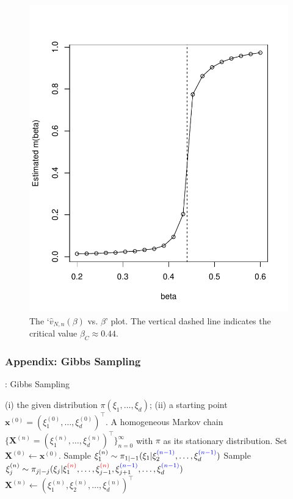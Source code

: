 \documentclass[11pt,letterpaper, leqno]{article}
\numberwithin{equation}{section}
\numberwithin{theorem}{section}
\numberwithin{lemma}{section}
\numberwithin{corollary}{section}
\numberwithin{definition}{section}
\numberwithin{proposition}{section}
\numberwithin{remark}{section}
\numberwithin{example}{section}
\newcommand{\T}{\intercal}
\begin{document}
\begin{figure}
    \centering
    \includegraphics[scale=0.6]{M_beta.pdf}
    \caption{The `$\widehat{v}_{N,n}(\beta)$ vs. $\beta$' plot. The vertical dashed line indicates the critical value $\beta_C\approx 0.44$.}
    \label{fig: M_beta}
\end{figure}

\subsubsection{Appendix: Gibbs Sampling}

\begin{algorithm}[H]
\caption{: Gibbs Sampling}\label{algorithm: Gibbs sampling}
\begin{algorithmic}[1]
    \INPUT (i) the given distribution $\pi(\xi_1,\ldots,\xi_d)$; (ii) a starting point $\boldsymbol{x}^{(0)}=(\xi^{(0)}_1,\ldots, \xi^{(0)}_d)^\T$.
    \OUTPUT A homogeneous Markov chain $\{\boldsymbol{X}^{(n)}=(\xi_1^{(n)}, \ldots, \xi_d^{(n)})^\T\}_{n=0}^\infty$ with $\pi$ as its stationary distribution.
    \STATE Set $\boldsymbol{X}^{(0)}  \leftarrow\boldsymbol{x}^{(0)}$.
    \STATE Sample $\xi_1^{(n)}\sim \pi_{1\vert-1}(\xi_1\vert \xi_2^{\textcolor{blue}{(n-1)}}, \ldots, \xi_d^{\textcolor{blue}{(n-1)}})$
    \STATE Sample $\xi_j^{(n)} \sim \pi_{j\vert-j}(\xi_j \vert \xi_1^{\textcolor{red}{(n)}},\ldots,\xi_{j-1}^{\textcolor{red}{(n)}}, \xi_{j+1}^{\textcolor{blue}{(n-1)}},\ldots, \xi_{d}^{\textcolor{blue}{(n-1)}})$
    \ENDFOR
    $\boldsymbol{X}^{(n)} \leftarrow (\xi_1^{(n)}, \xi_2^{(n)}, \ldots, \xi_d^{(n)})^\T$
    \ENDFOR
\end{algorithmic}
\end{algorithm}
\end{document}
